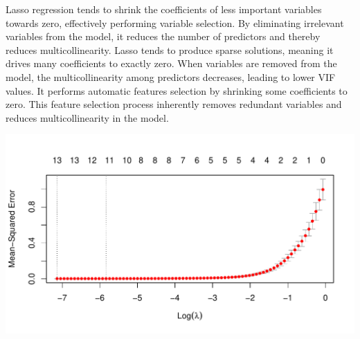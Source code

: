 \documentclass[
]{article}
\newenvironment{Shaded}{\begin{snugshade}}{\end{snugshade}}
\newcommand{\AttributeTok}[1]{\textcolor[rgb]{0.13,0.29,0.53}{#1}}
\newcommand{\CommentTok}[1]{\textcolor[rgb]{0.56,0.35,0.01}{\textit{#1}}}
\newcommand{\ConstantTok}[1]{\textcolor[rgb]{0.56,0.35,0.01}{#1}}
\newcommand{\DecValTok}[1]{\textcolor[rgb]{0.00,0.00,0.81}{#1}}
\newcommand{\FunctionTok}[1]{\textcolor[rgb]{0.13,0.29,0.53}{\textbf{#1}}}
\newcommand{\NormalTok}[1]{#1}
\newcommand{\OtherTok}[1]{\textcolor[rgb]{0.56,0.35,0.01}{#1}}
\newcommand{\SpecialCharTok}[1]{\textcolor[rgb]{0.81,0.36,0.00}{\textbf{#1}}}
\newcommand{\StringTok}[1]{\textcolor[rgb]{0.31,0.60,0.02}{#1}}
\begin{document}
Lasso regression tends to shrink the coefficients of less important
variables towards zero, effectively performing variable selection. By
eliminating irrelevant variables from the model, it reduces the number
of predictors and thereby reduces multicollinearity. Lasso tends to
produce sparse solutions, meaning it drives many coefficients to exactly
zero. When variables are removed from the model, the multicollinearity
among predictors decreases, leading to lower VIF values. It performs
automatic features selection by shrinking some coefficients to zero.
This feature selection process inherently removes redundant variables
and reduces multicollinearity in the model.

\begin{Shaded}
\end{Shaded}

\begin{center}\includegraphics{Statistical_Learning_Final_Report_files/figure-latex/lasso_regression-1} \end{center}
\end{document}
